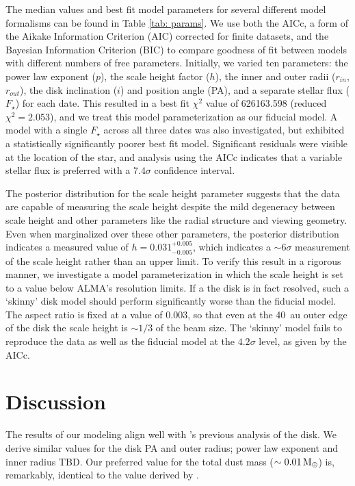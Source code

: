 \documentclass[12pt,oneside]{article}
\begin{document}
The median values and best fit model parameters for several different model formalisms can be found in Table \ref{tab: params}. 
We use both the AICc, a form of the Aikake Information Criterion (AIC) corrected for finite datasets, and the Bayesian Information Criterion (BIC) to compare goodness of fit between models with different numbers of free parameters.  
Initially, we varied ten parameters: the power law exponent ($p$), the scale height factor ($h$),  the inner and outer radii ($r_{in}$, $r_{out}$), the disk inclination  ($i$) and position angle (PA), and a separate stellar flux ($F_\star$) for each date. 
This resulted in a best fit $\chi^2$ value of 626163.598 (reduced $\chi^2=2.053$), and we treat this model parameterization as our fiducial model.
A model with a single $F_\star$ across all three dates was also investigated, but exhibited a statistically significantly poorer best fit model. 
Significant residuals were visible at the location of the star, and analysis using the AICc indicates that a variable stellar flux is preferred with a $7.4 \sigma$ confidence interval.

The posterior distribution for the scale height parameter suggests that the data are capable of measuring the scale height despite the mild degeneracy between scale height and other parameters like the radial structure and viewing geometry.  
Even when marginalized over these other parameters, the posterior distribution indicates a measured value of $h=0.031^{+0.005}_{-0.005}$, which indicates a $\sim 6 \sigma$ measurement of the scale height rather than an upper limit.
To verify this result in a rigorous manner, we investigate a model parameterization in which the scale height is set to a value below ALMA's resolution limits.
If a the disk is in fact resolved, such a `skinny' disk model should perform significantly worse than the fiducial model.
The aspect ratio is fixed at a value of $0.003$, so that even at the \SI{40}{au} outer edge of the disk the scale height is $\sim 1/3$ of the beam size.
The `skinny' model fails to reproduce the data as well as the fiducial model at the $4.2 \sigma$ level, as given by the AICc.


\section{Discussion}
\label{section: discussion}
The results of our modeling align well with \cite{macgregor13}'s previous analysis of the disk. We derive similar values for the disk PA and outer radius; power law exponent and inner radius TBD. Our preferred value for the total dust mass ($\sim \SI{0.01}{M_\oplus}$) is, remarkably, identical to the value derived by \cite{matthews15}.
\end{document}
